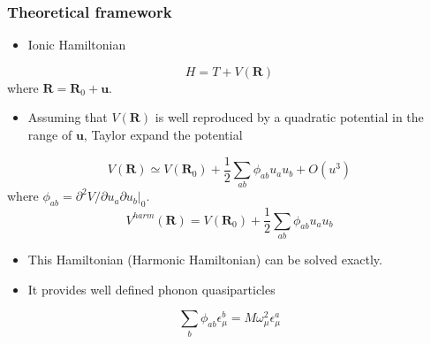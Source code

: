\documentclass{beamer}
\begin{document}
\begin{frame}

\frametitle{Theoretical framework}
\vspace{-0.1cm}
 \begin{itemize}
  \item Ionic Hamiltonian
 \end{itemize}
 \begin{equation}
  \nonumber
  H=T+V(\boldsymbol{R})
 \end{equation}
where $\boldsymbol{R}=\boldsymbol{R}_{0}+\boldsymbol{u}$.
\begin{itemize}
 \item Assuming that $V(\boldsymbol{R})$ is well reproduced by a quadratic potential in the range of $\boldsymbol{u}$, Taylor expand the potential
\end{itemize}
\begin{equation}
 \nonumber
 V(\boldsymbol{R})\simeq V(\boldsymbol{R}_{0}) + \frac{1}{2}\sum_{ab}\phi_{ab}u_{a}u_{b} + O(u^{3})
\end{equation}
where $\phi_{ab}=\partial^{2}V/\partial u_{a}\partial u_{b}|_{0}$.
\begin{equation}
 \nonumber
 V^{harm}(\boldsymbol{R})= V(\boldsymbol{R}_{0}) + \frac{1}{2}\sum_{ab}\phi_{ab}u_{a}u_{b} 
\end{equation}
\begin{itemize}
 \item This Hamiltonian (Harmonic Hamiltonian) can be solved exactly.
 \item It provides well defined phonon quasiparticles
\end{itemize}
\begin{equation}
 \nonumber
 \sum_{b}\phi_{ab}\epsilon^{b}_{\mu}=M\omega_{\mu}^{2}\epsilon^{a}_{\mu}
\end{equation}

\end{frame}

\end{document}
